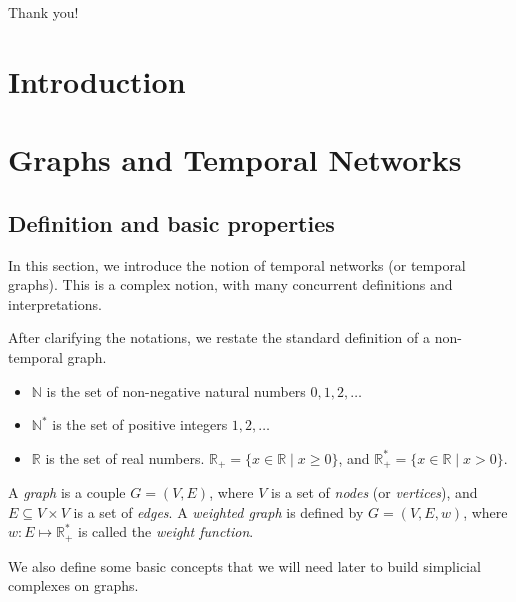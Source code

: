 \documentclass[a4paper,11pt,openany,extrafontsizes]{memoir}
\begin{document}
Thank you!

\cleardoublepage%

\tableofcontents
\listoffigures

\clearpage

\mainmatter%

\chapter{Introduction}%
\label{cha:introduction}


\chapter{Graphs and Temporal Networks}%
\label{cha:temporal-networks}

\section{Definition and basic properties}%
\label{sec:defin-basic-prop}

In this section, we introduce the notion of temporal networks (or
temporal graphs). This is a complex notion, with many concurrent
definitions and interpretations.

After clarifying the notations, we restate the standard definition of
a non-temporal graph.

\begin{notation}
  \begin{itemize}
  \item $\mathbb{N}$ is the set of non-negative natural numbers
    $0,1,2,\ldots$ 
  \item $\mathbb{N}^*$ is the set of positive integers $1,2,\ldots$
  \item $\mathbb{R}$ is the set of real numbers.
    $\mathbb{R}_+ = \{x\in\mathbb{R} \;|\; x\geq 0\}$, and
    $\mathbb{R}_+^* = \{x\in\mathbb{R} \;|\; x>0\}$.
\end{itemize}
\end{notation}

\begin{defn}[Graph]
  A \emph{graph} is a couple $G = (V, E)$, where $V$ is a set of
  \emph{nodes} (or \emph{vertices}), and $E \subseteq V\times V$ is a
  set of \emph{edges}. A \emph{weighted graph} is defined by
  $G = (V, E, w)$, where $w : E\mapsto \mathbb{R}_+^*$ is called the
  \emph{weight function}.
\end{defn}

We also define some basic concepts that we will need later to build
simplicial complexes on graphs.
\end{document}
